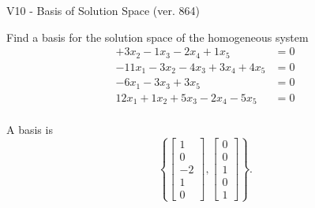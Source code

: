 \begin{exercise}
  \begin{exerciseTitle}V10 - Basis of Solution Space (ver. 864)\end{exerciseTitle}
  \begin{exerciseStatement}
    Find a basis for the solution space of the homogeneous system 
\begin{align*}
 + 3 x_ 2 -1 x_ 3 -2 x_ 4 + 1 x_ 5 &= 0  \\ 
  -11 x_ 1 -3 x_ 2 -4 x_ 3 + 3 x_ 4 + 4 x_ 5 &= 0  \\ 
  -6 x_ 1 -3 x_ 3 + 3 x_ 5 &= 0  \\ 
  12 x_ 1 + 1 x_ 2 + 5 x_ 3 -2 x_ 4 -5 x_ 5 &= 0  \\ 
 \end{align*}


 
  \end{exerciseStatement}

  \begin{exerciseAnswer}
   A basis is   
\[\left\{\left[\begin{array}{c}
1 \\
0 \\
-2 \\
1 \\
0
\end{array}\right] , \left[\begin{array}{c}
0 \\
0 \\
1 \\
0 \\
1
\end{array}\right]\right\}.\]

  


  \end{exerciseAnswer}
\end{exercise}